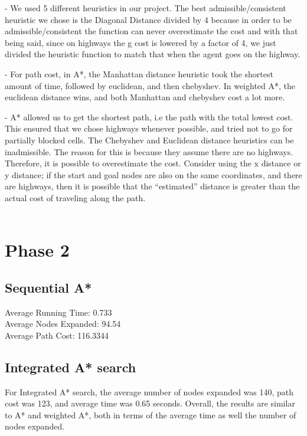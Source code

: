 \documentclass{report}
\begin{document}
        - We used 5 different heuristics in our project. The best admissible/consistent heuristic we chose is the Diagonal Distance divided by 4 because in order to be admissible/consistent the function can never overestimate the cost and with that being said, since on highways the g cost is lowered by a factor of 4, we just divided the heuristic function to match that when the agent goes on the highway.

        - For path cost, in A*, the Manhattan distance heuristic took the shortest amount of time, followed by euclidean, and then chebyshev. In weighted A*, the euclidean distance wins, and both Manhattan and chebyshev cost a lot more.

        - A* allowed us to get the shortest path, i.e the path with the total lowest cost. This ensured that we chose highways whenever possible, and tried not to go for partially blocked cells.
        The Chebyshev and Euclidean distance heuristics can be inadmissible. The reason for this is because they assume there are no highways. Therefore, it is possible to overestimate the cost. Consider using the x distance or y distance; if the start and goal nodes are also on the same coordinates, and there are highways, then it is possible that the “estimated” distance is greater than the actual cost of traveling along the path. \\ \\


        \section{Phase 2}

        \subsection{Sequential A*}
        Average Running Time: 0.733\\
        Average Nodes Expanded: 94.54 \\
        Average Path Cost: 116.3344 \\

       \subsection{Integrated A* search}
        For Integrated A* search, the average number of nodes expanded was 140, path cost was 123, and average time was 0.65 seconds. Overall, the results are similar to A* and weighted A*, both in terms of the average time as well the number of nodes expanded.
\end{document}
